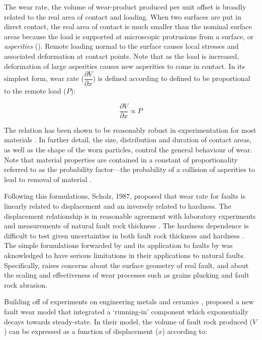 \documentclass[12pt,a4paper]{article}
\begin{document}
The wear rate, the volume of wear-product produced per unit offset is broadly related to the real area of contact and loading. When two surfaces are put in direct contact, the real area of contact is much smaller than the nominal surface areas because the load is supported at microscopic protrusions from a surface, or \textit{asperities} (\cite{archard1953contact, greenwood1966contact, bowden2001friction, dieterich1996imaging}). Remote loading normal to the surface causes local stresses and associated deformation at contact points. Note that as the load is increased, deformation of large asperities causes new asperities to come in contact. In its simplest form, wear rate ($\dfrac{\partial V}{\partial x}$) is defined according to defined to be proportional to the remote load ($P$):

\begin{equation}
\dfrac{\partial V}{\partial x}\varpropto P
\end{equation}

The relation has been shown to be reasonably robust in experimentation for most materials \cite{archard1953contact}. In further detail, the size, distribution and duration of contact areas, as well as the shape of the worn particles, control the general behaviour of wear. Note that material properties are contained in a constant of proportionality referred to as the probability factor—the probability of a collision of asperities to lead to removal of material \cite{archard1953contact}.

	Following this formulations, Scholz, 1987, proposed that wear rate for faults is linearly related to displacement and an inversely related to hardness. The displacement relationship is in reasonable agreement with laboratory experiments \cite{yoshioka1986fracture} and measurements of natural fault rock thickness \cite{robertson1982continuous, shipton2006thick}. The hardness dependence is difficult to test given uncertainties in both fault rock thickness and hardness \citep{scholz1987wear}. The simple formulations forwarded by \citet{archard1953contact} and its application to faults by \citet{scholz1987wear} was aknowledged to have serious limitations in their applications to natural faults. Specifically, \citet{scholz1987wear} raises concerns about the surface geometry of real fault, and about the scaling and effectiveness of wear processes such as grains plucking and fault rock abrasion.

   Building off of experiments on engineering metals \cite{queener1965transient} and ceramics \cite{levy1988unlubricated}, \citet{power1988roughness, wang1994wear} proposed a new fault wear model that integrated a `running-in' component which exponentially decays towards steady-state. In their model, the volume of fault rock produced ($V$) can be expressed as a function of displacement ($x$) according to:
   
\end{document}
